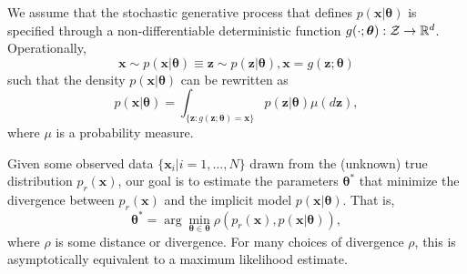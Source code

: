 \documentclass[twocolumn,superscriptaddress,aps]{revtex4-1}
\newcommand{\bftheta}{{\bm \theta}}
\newcommand{\bfx}{\mathbf{x}}
\newcommand{\bfz}{\mathbf{z}}
\theoremstyle{plain}
\begin{document}

We assume that the stochastic generative process that defines $p(\mathbf{x}|\bftheta)$ is
specified through a non-differentiable deterministic function $g(\cdot; \bftheta) : {\cal Z} \to
\mathbb{R}^d$. Operationally, %
\begin{equation}\label{eqn:p_theta}
    \mathbf{x} \sim p(\mathbf{x}|\bftheta) \equiv \bfz \sim p(\bfz|\bftheta), \mathbf{x} = g(\bfz; \bftheta)
\end{equation}
such that the density $p(\mathbf{x}|\bftheta)$ can be 
rewritten as
\begin{equation}\label{eqn:p_x_sim}
    p(\mathbf{x}|\bftheta) = \int_{\{\bfz:g(\bfz;\bftheta) = \bfx \}} p(\bfz|\bftheta) \mu(d\bfz),
\end{equation}
where $\mu$ is a probability measure.

Given some observed data $\{ \mathbf{x}_i | i=1, \dots, N \}$ drawn from the
(unknown) true distribution $p_r(\mathbf{x})$, our goal is to estimate the parameters 
$\bftheta^*$ that minimize the divergence between $p_r(\mathbf{x})$ and
the implicit model $p(\mathbf{x}|\bftheta)$. That is,
\begin{equation}
    \bftheta^* = \arg \min_{\bftheta \in \bftheta} \rho(p_r(\mathbf{x}), p(\mathbf{x}|\bftheta)),
\end{equation}
where $\rho$ is some distance or divergence. For many choices of divergence $\rho$, this is asymptotically equivalent to a maximum likelihood estimate.
\end{document}
